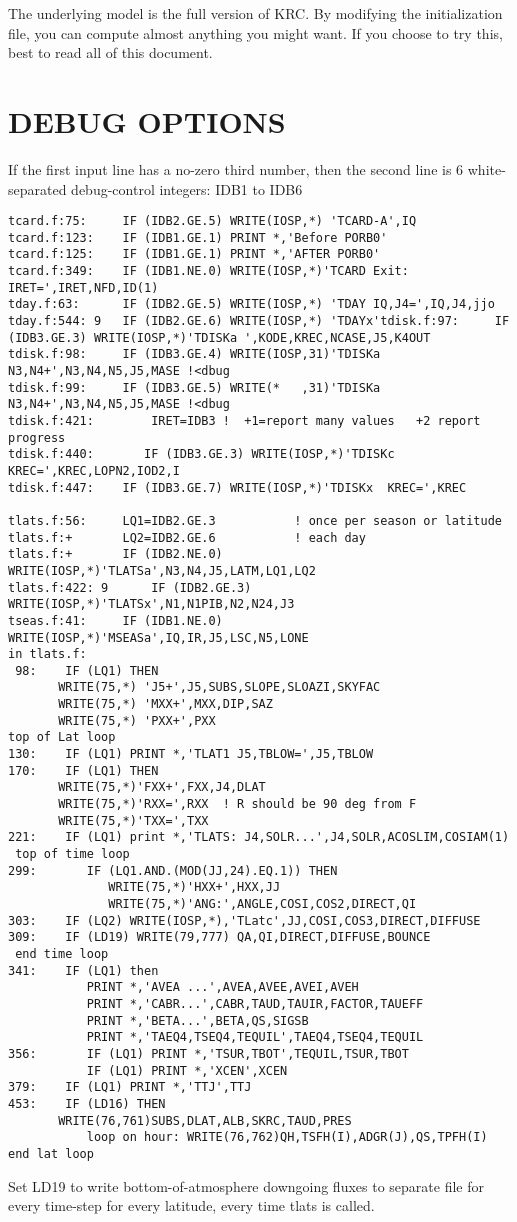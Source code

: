 \documentclass[draft]{article}  %
\begin{document}
The underlying model is the full version of KRC. By modifying the initialization
file, you can compute almost anything you might want. If you choose to try this,
best to read all of this document.

\section{ DEBUG OPTIONS \label{debug}}
If the first input line has a no-zero third number, then the second line is 6 
white-separated debug-control integers: IDB1 to IDB6
\vspace{-3.mm} 
\begin{verbatim}
tcard.f:75:     IF (IDB2.GE.5) WRITE(IOSP,*) 'TCARD-A',IQ
tcard.f:123:    IF (IDB1.GE.1) PRINT *,'Before PORB0'
tcard.f:125:    IF (IDB1.GE.1) PRINT *,'AFTER PORB0'
tcard.f:349:    IF (IDB1.NE.0) WRITE(IOSP,*)'TCARD Exit: IRET=',IRET,NFD,ID(1) 
tday.f:63:      IF (IDB2.GE.5) WRITE(IOSP,*) 'TDAY IQ,J4=',IQ,J4,jjo
tday.f:544: 9   IF (IDB2.GE.6) WRITE(IOSP,*) 'TDAYx'tdisk.f:97:     IF (IDB3.GE.3) WRITE(IOSP,*)'TDISKa ',KODE,KREC,NCASE,J5,K4OUT
tdisk.f:98:     IF (IDB3.GE.4) WRITE(IOSP,31)'TDISKa N3,N4+',N3,N4,N5,J5,MASE !<dbug
tdisk.f:99:     IF (IDB3.GE.5) WRITE(*   ,31)'TDISKa N3,N4+',N3,N4,N5,J5,MASE !<dbug
tdisk.f:421:        IRET=IDB3 !  +1=report many values   +2 report progress 
tdisk.f:440:       IF (IDB3.GE.3) WRITE(IOSP,*)'TDISKc KREC=',KREC,LOPN2,IOD2,I
tdisk.f:447:    IF (IDB3.GE.7) WRITE(IOSP,*)'TDISKx  KREC=',KREC

tlats.f:56:     LQ1=IDB2.GE.3           ! once per season or latitude
tlats.f:+       LQ2=IDB2.GE.6           ! each day
tlats.f:+       IF (IDB2.NE.0) WRITE(IOSP,*)'TLATSa',N3,N4,J5,LATM,LQ1,LQ2
tlats.f:422: 9      IF (IDB2.GE.3) WRITE(IOSP,*)'TLATSx',N1,N1PIB,N2,N24,J3
tseas.f:41:     IF (IDB1.NE.0) WRITE(IOSP,*)'MSEASa',IQ,IR,J5,LSC,N5,LONE
in tlats.f:
 98:	IF (LQ1) THEN
	   WRITE(75,*) 'J5+',J5,SUBS,SLOPE,SLOAZI,SKYFAC
	   WRITE(75,*) 'MXX+',MXX,DIP,SAZ
	   WRITE(75,*) 'PXX+',PXX
top of Lat loop
130:    IF (LQ1) PRINT *,'TLAT1 J5,TBLOW=',J5,TBLOW
170:	IF (LQ1) THEN
	   WRITE(75,*)'FXX+',FXX,J4,DLAT
	   WRITE(75,*)'RXX=',RXX  ! R should be 90 deg from F
	   WRITE(75,*)'TXX=',TXX
221:    IF (LQ1) print *,'TLATS: J4,SOLR...',J4,SOLR,ACOSLIM,COSIAM(1)
 top of time loop
299:	   IF (LQ1.AND.(MOD(JJ,24).EQ.1)) THEN
     	      WRITE(75,*)'HXX+',HXX,JJ
              WRITE(75,*)'ANG:',ANGLE,COSI,COS2,DIRECT,QI
303:    IF (LQ2) WRITE(IOSP,*),'TLatc',JJ,COSI,COS3,DIRECT,DIFFUSE 
309:    IF (LD19) WRITE(79,777) QA,QI,DIRECT,DIFFUSE,BOUNCE
 end time loop
341:    IF (LQ1) then 
           PRINT *,'AVEA ...',AVEA,AVEE,AVEI,AVEH
           PRINT *,'CABR...',CABR,TAUD,TAUIR,FACTOR,TAUEFF
           PRINT *,'BETA...',BETA,QS,SIGSB 
           PRINT *,'TAEQ4,TSEQ4,TEQUIL',TAEQ4,TSEQ4,TEQUIL
356:       IF (LQ1) PRINT *,'TSUR,TBOT',TEQUIL,TSUR,TBOT
           IF (LQ1) PRINT *,'XCEN',XCEN 
379:    IF (LQ1) PRINT *,'TTJ',TTJ
453:    IF (LD16) THEN
	   WRITE(76,761)SUBS,DLAT,ALB,SKRC,TAUD,PRES
           loop on hour: WRITE(76,762)QH,TSFH(I),ADGR(J),QS,TPFH(I)
end lat loop
\end{verbatim}
Set LD19 to write bottom-of-atmosphere downgoing fluxes to separate file
for every time-step for every latitude, every time tlats is called.
 
\end{document}
